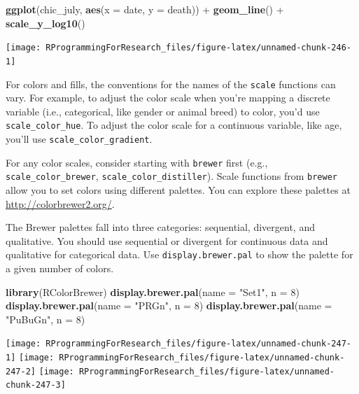 \documentclass[]{book}
\makeatletter
\newenvironment{Shaded}{\begin{snugshade}}{\end{snugshade}}
\newcommand{\KeywordTok}[1]{\textcolor[rgb]{0.13,0.29,0.53}{\textbf{{#1}}}}
\newcommand{\DataTypeTok}[1]{\textcolor[rgb]{0.13,0.29,0.53}{{#1}}}
\newcommand{\DecValTok}[1]{\textcolor[rgb]{0.00,0.00,0.81}{{#1}}}
\newcommand{\StringTok}[1]{\textcolor[rgb]{0.31,0.60,0.02}{{#1}}}
\newcommand{\NormalTok}[1]{{#1}}
\newenvironment{kframe}{%
\medskip{}
\setlength{\fboxsep}{.8em}
 \def\at@end@of@kframe{}%
 \ifinner\ifhmode%
  \def\at@end@of@kframe{\end{minipage}}%
  \begin{minipage}{\columnwidth}%
 \fi\fi%
 \def\FrameCommand##1{\hskip\@totalleftmargin \hskip-\fboxsep
 \colorbox{shadecolor}{##1}\hskip-\fboxsep
     \hskip-\linewidth \hskip-\@totalleftmargin \hskip\columnwidth}%
 \MakeFramed {\advance\hsize-\width
   \@totalleftmargin\z@ \linewidth\hsize
   \@setminipage}}%
 {\par\unskip\endMakeFramed%
 \at@end@of@kframe}
\renewenvironment{Shaded}{\begin{kframe}}{\end{kframe}}
\makeatother
\begin{document}
\begin{Shaded}
\begin{Highlighting}[]
\KeywordTok{ggplot}\NormalTok{(chic_july, }\KeywordTok{aes}\NormalTok{(}\DataTypeTok{x =} \NormalTok{date, }\DataTypeTok{y =} \NormalTok{death)) +}\StringTok{ }
\StringTok{  }\KeywordTok{geom_line}\NormalTok{() +}
\StringTok{  }\KeywordTok{scale_y_log10}\NormalTok{()}
\end{Highlighting}
\end{Shaded}

\begin{center}\texttt{[image: RProgrammingForResearch\_files/figure-latex/unnamed-chunk-246-1]} \end{center}

For colors and fills, the conventions for the names of the
\texttt{scale} functions can vary. For example, to adjust the color
scale when you're mapping a discrete variable (i.e., categorical, like
gender or animal breed) to color, you'd use \texttt{scale\_color\_hue}.
To adjust the color scale for a continuous variable, like age, you'll
use \texttt{scale\_color\_gradient}.

For any color scales, consider starting with \texttt{brewer} first
(e.g., \texttt{scale\_color\_brewer}, \texttt{scale\_color\_distiller}).
Scale functions from \texttt{brewer} allow you to set colors using
different palettes. You can explore these palettes at
\url{http://colorbrewer2.org/}.

The Brewer palettes fall into three categories: sequential, divergent,
and qualitative. You should use sequential or divergent for continuous
data and qualitative for categorical data. Use
\texttt{display.brewer.pal} to show the palette for a given number of
colors.

\begin{Shaded}
\begin{Highlighting}[]
\KeywordTok{library}\NormalTok{(RColorBrewer)}
\KeywordTok{display.brewer.pal}\NormalTok{(}\DataTypeTok{name =} \StringTok{"Set1"}\NormalTok{, }\DataTypeTok{n =} \DecValTok{8}\NormalTok{)}
\KeywordTok{display.brewer.pal}\NormalTok{(}\DataTypeTok{name =} \StringTok{"PRGn"}\NormalTok{, }\DataTypeTok{n =} \DecValTok{8}\NormalTok{)}
\KeywordTok{display.brewer.pal}\NormalTok{(}\DataTypeTok{name =} \StringTok{"PuBuGn"}\NormalTok{, }\DataTypeTok{n =} \DecValTok{8}\NormalTok{)}
\end{Highlighting}
\end{Shaded}

\texttt{[image: RProgrammingForResearch\_files/figure-latex/unnamed-chunk-247-1]}
\texttt{[image: RProgrammingForResearch\_files/figure-latex/unnamed-chunk-247-2]}
\texttt{[image: RProgrammingForResearch\_files/figure-latex/unnamed-chunk-247-3]}
\end{document}
